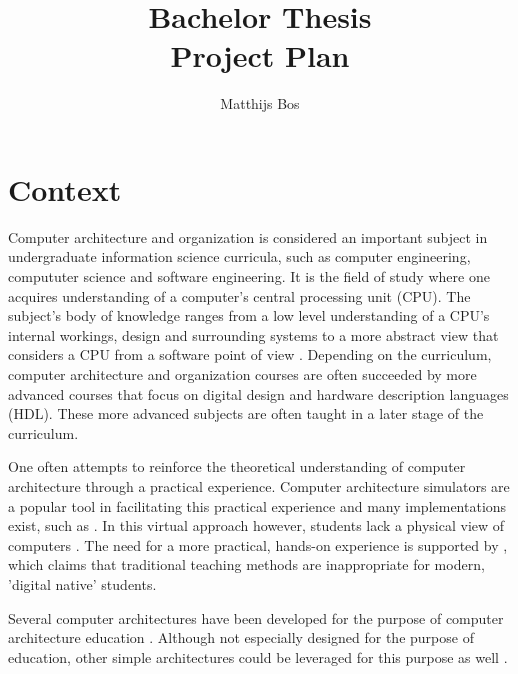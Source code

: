 \documentclass[singleside,openright]{uva-bachelor-thesis}
\title{Bachelor Thesis\\Project Plan}
\author{Matthijs Bos}
\begin{document}
\maketitle

\tableofcontents

\chapter{Context}


Computer architecture and organization is considered an important subject in undergraduate information science curricula, such as computer engineering, compututer science and software engineering. It is the field of study where one acquires understanding of a computer's central processing unit (CPU). The subject's body of knowledge ranges from a low level understanding of a CPU's internal workings, design and surrounding systems to a more abstract view that considers a CPU from a software point of view \cite[p.60]{soldan2004computer}. Depending on the curriculum, computer architecture and organization courses are often succeeded by more advanced courses that focus on digital design and hardware description languages (HDL). These more advanced subjects are often taught in a later stage of the curriculum. 

One often attempts to reinforce the theoretical understanding of computer architecture through a practical experience. Computer architecture simulators are a popular tool in facilitating this practical experience and many implementations exist, such as \cite{mariesim}. In this virtual approach however, students lack a physical view of computers \cite[p.1]{nativeFPGA}. The need for a more practical, hands-on experience is supported by \cite{digitalNatives}, which claims that traditional teaching methods are inappropriate for modern, 'digital native' students.

Several computer architectures have been developed for the purpose of computer architecture education \cite{nativeFPGA, jansen2014every, 6211804, nakano2008processor, holland2003harnessing}. Although not especially designed for the purpose of education, other simple architectures could be leveraged for this purpose as well \cite{suresh2014fpga}.
\end{document}
